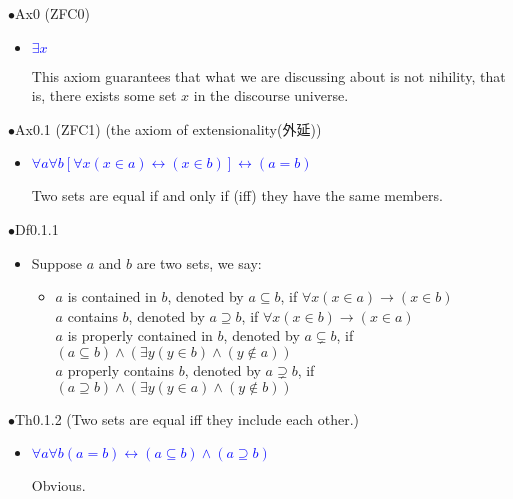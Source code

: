\documentclass{article}
\begin{document}
{\Large $\bullet $Ax0 (ZFC0)}\par
\begin{itemize}
    \item[]
    {\large \textcolor{blue}{$\exists x$}}\par
    \textcolor{pf}{This axiom guarantees that what we are discussing about is not nihility, 
    that is, there exists some set $x$ in the discourse universe.}
\end{itemize}\par
\quad

{\Large $\bullet $Ax0.1 (ZFC1) (the axiom of extensionality(外延))}\par
\begin{itemize}
    \item[]
    {\large \textcolor{blue}{$\forall a\forall b[\forall x(x\in a)\leftrightarrow (x\in b)]\leftrightarrow (a=b)$}}\par
    \textcolor{pf}{Two sets are equal if and only if (iff) they have the same members.}
\end{itemize}\par
\quad

{\Large $\bullet $Df0.1.1}\par
\begin{itemize}
    \item[]
    {\large Suppose $a$ and $b$ are two sets, we say:
    \begin{itemize}
        \item[] 
        $a$ is contained in $b$, denoted by $a\subseteq b$, if $\forall x(x\in a)\rightarrow (x\in b)$ \\
        $a$ contains $b$, denoted by $a\supseteq b$, if $\forall x(x\in b)\rightarrow (x\in a)$ \\
        $a$ is properly contained in $b$, denoted by $a\subsetneq b$, if $(a\subseteq b)\land (\exists y(y\in b)\land (y\notin a))$ \\
        $a$ properly contains $b$, denoted by $a\supsetneq b$, if $(a\supseteq b)\land (\exists y(y\in a)\land (y\notin b))$ 
    \end{itemize}}
\end{itemize}\par
\quad

{\Large $\bullet $Th0.1.2 (Two sets are equal iff they include each other.)}\par
\begin{itemize}
    \item[]
    {\large \textcolor{blue}{$\forall a\forall b(a=b)\leftrightarrow(a\subseteq b)\land(a\supseteq b)$}}\par
    {\textcolor{pf}{Obvious.}}
\end{itemize}\par
\quad
\end{document}
